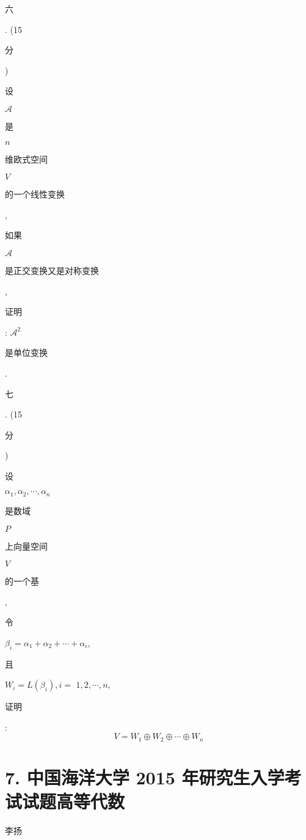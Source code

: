 \documentclass[10pt]{article}
\begin{document}
\begin{CJK}{UTF8}{mj}六\end{CJK}. (15 \begin{CJK}{UTF8}{mj}分\end{CJK}) \begin{CJK}{UTF8}{mj}设\end{CJK} $\mathscr{A}$ \begin{CJK}{UTF8}{mj}是\end{CJK} $n$ \begin{CJK}{UTF8}{mj}维欧式空间\end{CJK} $V$ \begin{CJK}{UTF8}{mj}的一个线性变换\end{CJK}, \begin{CJK}{UTF8}{mj}如果\end{CJK} $\mathscr{A}$ \begin{CJK}{UTF8}{mj}是正交变换又是对称变换\end{CJK}, \begin{CJK}{UTF8}{mj}证明\end{CJK}: $\mathscr{A}^{2}$ \begin{CJK}{UTF8}{mj}是单位变换\end{CJK}. \begin{CJK}{UTF8}{mj}七\end{CJK}. (15 \begin{CJK}{UTF8}{mj}分\end{CJK}) \begin{CJK}{UTF8}{mj}设\end{CJK} $\alpha_{1}, \alpha_{2}, \cdots, \alpha_{n}$ \begin{CJK}{UTF8}{mj}是数域\end{CJK} $P$ \begin{CJK}{UTF8}{mj}上向量空间\end{CJK} $V$ \begin{CJK}{UTF8}{mj}的一个基\end{CJK}, \begin{CJK}{UTF8}{mj}令\end{CJK} $\beta_{i}=\alpha_{1}+\alpha_{2}+\cdots+\alpha_{i}$, \begin{CJK}{UTF8}{mj}且\end{CJK} $W_{i}=L\left(\beta_{i}\right), i=$ $1,2, \cdots, n$, \begin{CJK}{UTF8}{mj}证明\end{CJK}:
$$
V=W_{1} \oplus W_{2} \oplus \cdots \oplus W_{n}
$$

\section{7. 中国海洋大学 2015 年研究生入学考试试题高等代数}
\begin{CJK}{UTF8}{mj}李扬\end{CJK}
\end{document}
